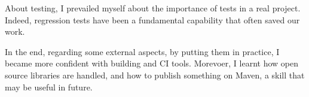 \bigskip
About testing, I prevailed myself about the importance of tests in a real project. Indeed, regression tests have been a fundamental capability that often saved our work.

\bigskip
In the end, regarding some external aspects, by putting them in practice, I became more confident with building and CI tools. Morevoer, I learnt how open source libraries are handled, and how to publish something on Maven, a skill that may be useful in future.










